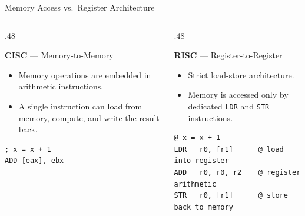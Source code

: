 \documentclass[9pt,aspectratio=169,xcolor=table]{beamer}
\begin{document}
\begin{frame}[fragile]{Memory Access vs.\ Register Architecture}
	\begin{columns}[T]
		\begin{column}{.48\textwidth}
			\begin{minipage}[t][.28\textheight][t]{\linewidth}
				\textbf{CISC} --- Memory-to-Memory
				\begin{itemize}
					\item Memory operations are embedded in arithmetic instructions.
					\item A single instruction can load from memory, compute, and write the result back.
				\end{itemize}
			\end{minipage}

			{\small\color{red!75!black}
				\begin{verbatim}
; x = x + 1
ADD [eax], ebx
			\end{verbatim}}
		\end{column}
		\begin{column}{.48\textwidth}
			\begin{minipage}[t][.28\textheight][t]{\linewidth}
				\textbf{RISC} --- Register-to-Register
				\begin{itemize}
					\item Strict load-store architecture.
					\item Memory is accessed only by dedicated \texttt{LDR} and \texttt{STR} instructions.
				\end{itemize}
			\end{minipage}

			{\small\color{red!75!black}
				\begin{verbatim}
@ x = x + 1
LDR   r0, [r1]      @ load into register
ADD   r0, r0, r2    @ register arithmetic
STR   r0, [r1]      @ store back to memory
			\end{verbatim}}
		\end{column}
	\end{columns}
\end{frame}
\end{document}

